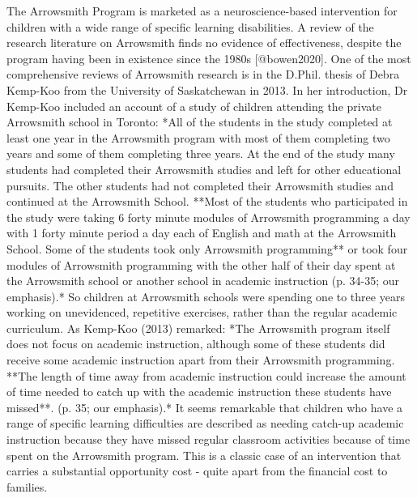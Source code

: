 \documentclass{krantz}
\begin{document}
\begin{tcolorbox}[colback=Black!5!lightgray,colframe=black!75!black,coltitle=white,title=The Arrowsmith Program]\label{box:Arrowsmith}
The Arrowsmith Program is marketed as a neuroscience-based intervention for children with a wide range of specific learning disabilities. A review of the research literature on Arrowsmith finds no evidence of effectiveness, despite the program having been in existence since the 1980s [@bowen2020]. One of the most comprehensive reviews of Arrowsmith research is in the D.Phil. thesis of Debra Kemp-Koo from the University of Saskatchewan in 2013. In her introduction, Dr Kemp-Koo included an account of a study of children attending the private Arrowsmith school in Toronto: *All of the students in the study completed at least one year in the Arrowsmith program with most of them completing two years and some of them completing three years. At the end of the study many students had completed their Arrowsmith studies and left for other educational pursuits. The other students had not completed their Arrowsmith studies and continued at the Arrowsmith School. **Most of the students who participated in the study were taking 6 forty minute modules of Arrowsmith programming a day with 1 forty minute period a day each of English and math at the Arrowsmith School. Some of the students took only Arrowsmith programming** or took four modules of Arrowsmith programming with the other half of their day spent at the Arrowsmith school or another school in academic instruction (p. 34-35; our emphasis).*
So children at Arrowsmith schools were spending one to three years working on unevidenced, repetitive exercises, rather than the regular academic curriculum. As Kemp-Koo (2013) remarked: *The Arrowsmith program itself does not focus on academic instruction, although some of these students did receive some academic instruction apart from their Arrowsmith programming. **The length of time away from academic instruction could increase the amount of time needed to catch up with the academic instruction these students have missed**. (p. 35; our emphasis).*  
It seems remarkable that children who have a range of specific learning difficulties are described as needing catch-up academic instruction because they have missed regular classroom activities because of time spent on the Arrowsmith program. This is a classic case of an intervention that carries a substantial opportunity cost - quite apart from the financial cost to families.  
\end{tcolorbox}
\end{document}
